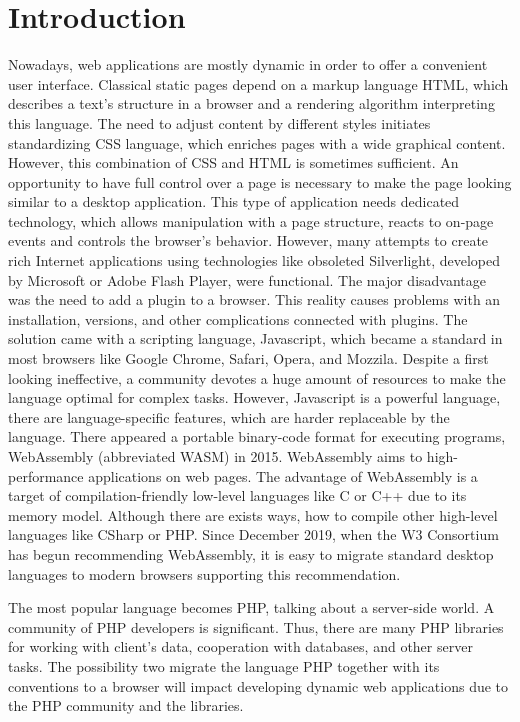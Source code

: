 \chapter*{Introduction}

Nowadays, web applications are mostly dynamic in order to offer a convenient user interface.
Classical static pages depend on a markup language HTML, which describes a text's structure in a browser and a rendering algorithm interpreting this language.
The need to adjust content by different styles initiates standardizing CSS language, which enriches pages with a wide graphical content.
However, this combination of CSS and HTML is sometimes sufficient. An opportunity to have full control over a page is necessary to make the page looking similar to a desktop application.
This type of application needs dedicated technology, which allows manipulation with a page structure, reacts to on-page events and controls the browser's behavior.
However, many attempts to create rich Internet applications using technologies like obsoleted Silverlight, developed by Microsoft or Adobe Flash Player, were functional. 
The major disadvantage was the need to add a plugin to a browser.
This reality causes problems with an installation, versions, and other complications connected with plugins.
The solution came with a scripting language, Javascript, which became a standard in most browsers like Google Chrome, Safari, Opera, and Mozzila.
Despite a first looking ineffective, a community devotes a huge amount of resources to make the language optimal for complex tasks.
However, Javascript is a powerful language, there are language-specific features, which are harder replaceable by the language.
There appeared a portable binary-code format for executing programs, WebAssembly (abbreviated WASM) \cite{1} in 2015.
WebAssembly aims to high-performance applications on web pages.
The advantage of WebAssembly is a target of compilation-friendly low-level languages like C or C++ due to its memory model.
Although there are exists ways, how to compile other high-level languages like CSharp or PHP.
Since December 2019, when the W3 Consortium has begun recommending WebAssembly, it is easy to migrate standard desktop languages to modern browsers supporting this recommendation.

The most popular language becomes PHP, talking about a server-side world.
A community of PHP developers is significant.
Thus, there are many PHP libraries for working with client's data, cooperation with databases, and other server tasks.
The possibility two migrate the language PHP together with its conventions to a browser will impact developing dynamic web applications due to the PHP community and the libraries.

